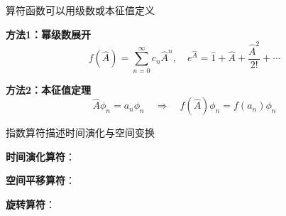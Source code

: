 \begin{frame}{算符函数可以用级数或本征值定义}

  

    \begin{iqbitemize}
    \item \textbf{方法1：幂级数展开}
    \[
      f(\hat{A}) = \sum_{n=0}^{\infty} c_n\hat{A}^n, \quad
      e^{\hat{A}} = \hat{1} + \hat{A} + \dfrac{\hat{A}^2}{2!} + \cdots
    \]

    \item \textbf{方法2：本征值定理}
    \[
      \hat{A}\phi_n = a_n\phi_n \quad \Rightarrow \quad f(\hat{A})\phi_n = f(a_n)\phi_n
    \]
    \end{iqbitemize}

    \iqbsep

    \end{frame}

\begin{frame}{指数算符描述时间演化与空间变换}

  
    \begin{iqbitemize}
    \item \textbf{时间演化算符}：

    \item \textbf{空间平移算符}：

    \item \textbf{旋转算符}：
    \end{iqbitemize}
  
\end{frame}

